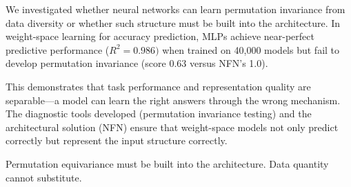 
We investigated whether neural networks can learn permutation invariance from data diversity or whether such structure must be built into the architecture. In weight-space learning for accuracy prediction, MLPs achieve near-perfect predictive performance ($R^{2}=0.986)$ when trained on 40,000 models but fail to develop permutation invariance (score 0.63 versus NFN's 1.0).

This demonstrates that task performance and representation quality are separable---a model can learn the right answers through the wrong mechanism. The diagnostic tools developed (permutation invariance testing) and the architectural solution (NFN) ensure that weight-space models not only predict correctly but represent the input structure correctly.

Permutation equivariance must be built into the architecture. Data quantity cannot substitute.

